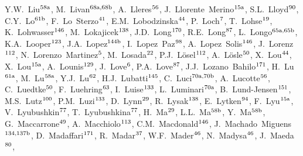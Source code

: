 \begin{flushleft}
Y.W.~Liu$^\textrm{\scriptsize 58a}$,    
M.~Livan$^\textrm{\scriptsize 68a,68b}$,    
A.~Lleres$^\textrm{\scriptsize 56}$,    
J.~Llorente~Merino$^\textrm{\scriptsize 15a}$,    
S.L.~Lloyd$^\textrm{\scriptsize 90}$,    
C.Y.~Lo$^\textrm{\scriptsize 61b}$,    
F.~Lo~Sterzo$^\textrm{\scriptsize 41}$,    
E.M.~Lobodzinska$^\textrm{\scriptsize 44}$,    
P.~Loch$^\textrm{\scriptsize 7}$,    
T.~Lohse$^\textrm{\scriptsize 19}$,    
K.~Lohwasser$^\textrm{\scriptsize 146}$,    
M.~Lokajicek$^\textrm{\scriptsize 138}$,    
J.D.~Long$^\textrm{\scriptsize 170}$,    
R.E.~Long$^\textrm{\scriptsize 87}$,    
L.~Longo$^\textrm{\scriptsize 65a,65b}$,    
K.A.~Looper$^\textrm{\scriptsize 123}$,    
J.A.~Lopez$^\textrm{\scriptsize 144b}$,    
I.~Lopez~Paz$^\textrm{\scriptsize 98}$,    
A.~Lopez~Solis$^\textrm{\scriptsize 146}$,    
J.~Lorenz$^\textrm{\scriptsize 112}$,    
N.~Lorenzo~Martinez$^\textrm{\scriptsize 5}$,    
M.~Losada$^\textrm{\scriptsize 22}$,    
P.J.~L{\"o}sel$^\textrm{\scriptsize 112}$,    
A.~L\"osle$^\textrm{\scriptsize 50}$,    
X.~Lou$^\textrm{\scriptsize 44}$,    
X.~Lou$^\textrm{\scriptsize 15a}$,    
A.~Lounis$^\textrm{\scriptsize 129}$,    
J.~Love$^\textrm{\scriptsize 6}$,    
P.A.~Love$^\textrm{\scriptsize 87}$,    
J.J.~Lozano~Bahilo$^\textrm{\scriptsize 171}$,    
H.~Lu$^\textrm{\scriptsize 61a}$,    
M.~Lu$^\textrm{\scriptsize 58a}$,    
Y.J.~Lu$^\textrm{\scriptsize 62}$,    
H.J.~Lubatti$^\textrm{\scriptsize 145}$,    
C.~Luci$^\textrm{\scriptsize 70a,70b}$,    
A.~Lucotte$^\textrm{\scriptsize 56}$,    
C.~Luedtke$^\textrm{\scriptsize 50}$,    
F.~Luehring$^\textrm{\scriptsize 63}$,    
I.~Luise$^\textrm{\scriptsize 133}$,    
L.~Luminari$^\textrm{\scriptsize 70a}$,    
B.~Lund-Jensen$^\textrm{\scriptsize 151}$,    
M.S.~Lutz$^\textrm{\scriptsize 100}$,    
P.M.~Luzi$^\textrm{\scriptsize 133}$,    
D.~Lynn$^\textrm{\scriptsize 29}$,    
R.~Lysak$^\textrm{\scriptsize 138}$,    
E.~Lytken$^\textrm{\scriptsize 94}$,    
F.~Lyu$^\textrm{\scriptsize 15a}$,    
V.~Lyubushkin$^\textrm{\scriptsize 77}$,    
T.~Lyubushkina$^\textrm{\scriptsize 77}$,    
H.~Ma$^\textrm{\scriptsize 29}$,    
L.L.~Ma$^\textrm{\scriptsize 58b}$,    
Y.~Ma$^\textrm{\scriptsize 58b}$,    
G.~Maccarrone$^\textrm{\scriptsize 49}$,    
A.~Macchiolo$^\textrm{\scriptsize 113}$,    
C.M.~Macdonald$^\textrm{\scriptsize 146}$,    
J.~Machado~Miguens$^\textrm{\scriptsize 134,137b}$,    
D.~Madaffari$^\textrm{\scriptsize 171}$,    
R.~Madar$^\textrm{\scriptsize 37}$,    
W.F.~Mader$^\textrm{\scriptsize 46}$,    
N.~Madysa$^\textrm{\scriptsize 46}$,    
J.~Maeda$^\textrm{\scriptsize 80}$,    

\end{flushleft}
